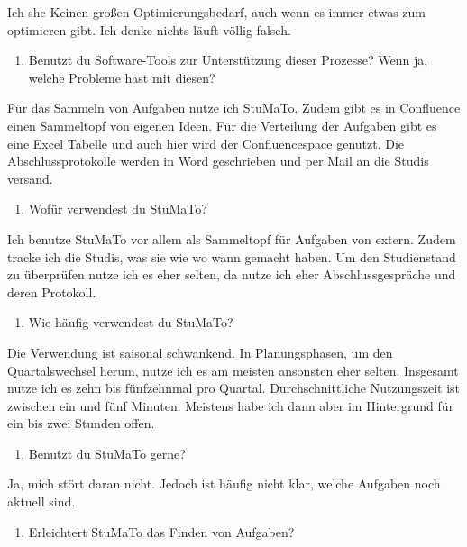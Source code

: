 \documentclass[
  12pt,
  ngerman,
  a4paper,
]{article}
\providecommand{\tightlist}{%
  \setlength{\itemsep}{0pt}\setlength{\parskip}{0pt}}
\begin{document}
Ich she Keinen großen Optimierungsbedarf, auch wenn es immer etwas zum
optimieren gibt. Ich denke nichts läuft völlig falsch.

\begin{enumerate}
\def\labelenumi{\arabic{enumi}.}
\setcounter{enumi}{7}
\tightlist
\item
  Benutzt du Software-Tools zur Unterstützung dieser Prozesse? Wenn ja,
  welche Probleme hast mit diesen?
\end{enumerate}

Für das Sammeln von Aufgaben nutze ich StuMaTo. Zudem gibt es in
Confluence einen Sammeltopf von eigenen Ideen. Für die Verteilung der
Aufgaben gibt es eine Excel Tabelle und auch hier wird der
Confluencespace genutzt. Die Abschlussprotokolle werden in Word
geschrieben und per Mail an die Studis versand.

\begin{enumerate}
\def\labelenumi{\arabic{enumi}.}
\setcounter{enumi}{8}
\tightlist
\item
  Wofür verwendest du StuMaTo?
\end{enumerate}

Ich benutze StuMaTo vor allem als Sammeltopf für Aufgaben von extern.
Zudem tracke ich die Studis, was sie wie wo wann gemacht haben. Um den
Studienstand zu überprüfen nutze ich es eher selten, da nutze ich eher
Abschlussgespräche und deren Protokoll.

\begin{enumerate}
\def\labelenumi{\arabic{enumi}.}
\setcounter{enumi}{9}
\tightlist
\item
  Wie häufig verwendest du StuMaTo?
\end{enumerate}

Die Verwendung ist saisonal schwankend. In Planungsphasen, um den
Quartalswechsel herum, nutze ich es am meisten ansonsten eher selten.
Insgesamt nutze ich es zehn bis fünfzehnmal pro Quartal.
Durchschnittliche Nutzungszeit ist zwischen ein und fünf Minuten.
Meistens habe ich dann aber im Hintergrund für ein bis zwei Stunden
offen.

\begin{enumerate}
\def\labelenumi{\arabic{enumi}.}
\setcounter{enumi}{10}
\tightlist
\item
  Benutzt du StuMaTo gerne?
\end{enumerate}

Ja, mich stört daran nicht. Jedoch ist häufig nicht klar, welche
Aufgaben noch aktuell sind.

\begin{enumerate}
\def\labelenumi{\arabic{enumi}.}
\setcounter{enumi}{11}
\tightlist
\item
  Erleichtert StuMaTo das Finden von Aufgaben?
\end{enumerate}
\end{document}

